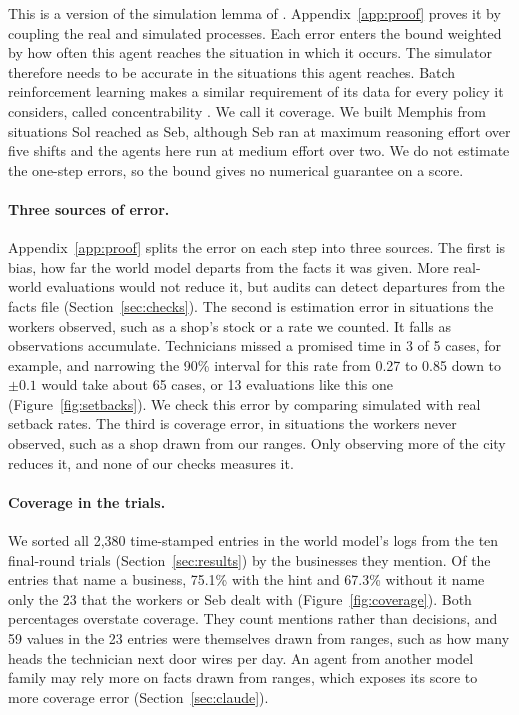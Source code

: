 \documentclass[10pt]{article}
\begin{document}
This is a version of the simulation lemma of \citet{kearns2002near}. Appendix~\ref{app:proof} proves it by coupling the real and simulated processes. Each error enters the bound weighted by how often this agent reaches the situation in which it occurs. The simulator therefore needs to be accurate in the situations this agent reaches. Batch reinforcement learning makes a similar requirement of its data for every policy it considers, called concentrability \citep{chen2019information}. We call it coverage. We built Memphis from situations Sol reached as Seb, although Seb ran at maximum reasoning effort over five shifts and the agents here run at medium effort over two. We do not estimate the one-step errors, so the bound gives no numerical guarantee on a score.

\paragraph{Three sources of error.} Appendix~\ref{app:proof} splits the error on each step into three sources. The first is bias, how far the world model departs from the facts it was given. More real-world evaluations would not reduce it, but audits can detect departures from the facts file (Section~\ref{sec:checks}). The second is estimation error in situations the workers observed, such as a shop's stock or a rate we counted. It falls as observations accumulate. Technicians missed a promised time in 3 of 5 cases, for example, and narrowing the 90\% interval for this rate from 0.27 to 0.85 down to $\pm 0.1$ would take about 65 cases, or 13 evaluations like this one (Figure~\ref{fig:setbacks}). We check this error by comparing simulated with real setback rates. The third is coverage error, in situations the workers never observed, such as a shop drawn from our ranges. Only observing more of the city reduces it, and none of our checks measures it.

\paragraph{Coverage in the trials.} We sorted all 2,380 time-stamped entries in the world model's logs
from the ten final-round trials (Section~\ref{sec:results}) by the businesses they mention. Of the entries that name a business, 75.1\% with the hint and 67.3\% without it name only the 23 that the workers or Seb dealt with (Figure~\ref{fig:coverage}). Both percentages overstate coverage. They count mentions rather than decisions, and 59 values in the 23 entries were themselves drawn from ranges, such as how many heads the technician next door wires per day. An agent from another model
family may rely more on facts drawn from ranges, which exposes its score to more coverage error (Section~\ref{sec:claude}).
\end{document}
